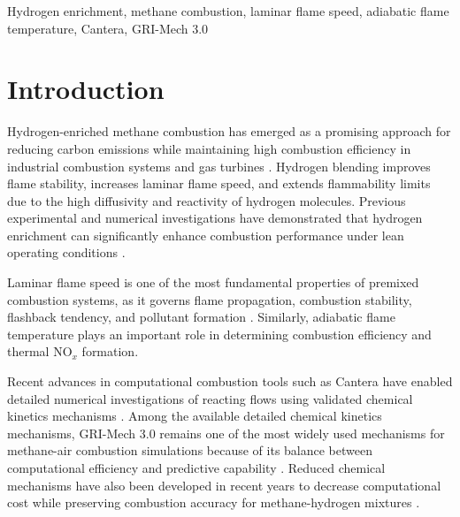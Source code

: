 \documentclass[conference]{IEEEtran}
\begin{document}

\begin{IEEEkeywords}

Hydrogen enrichment, methane combustion, laminar flame speed, adiabatic flame temperature, Cantera, GRI-Mech 3.0

\end{IEEEkeywords}


\section{Introduction}

Hydrogen-enriched methane combustion has emerged as a promising approach for reducing carbon emissions while maintaining high combustion efficiency in industrial combustion systems and gas turbines \cite{Garcia_2023,en14102834,Hermanns2007}. Hydrogen blending improves flame stability, increases laminar flame speed, and extends flammability limits due to the high diffusivity and reactivity of hydrogen molecules. Previous experimental and numerical investigations have demonstrated that hydrogen enrichment can significantly enhance combustion performance under lean operating conditions \cite{doi:10.1021/acsomega.1c01692,Garcia_2023}.

Laminar flame speed is one of the most fundamental properties of premixed combustion systems, as it governs flame propagation, combustion stability, flashback tendency, and pollutant formation \cite{doi:10.1021/acsomega.1c01692}. Similarly, adiabatic flame temperature plays an important role in determining combustion efficiency and thermal NO$_x$ formation.

Recent advances in computational combustion tools such as Cantera have enabled detailed numerical investigations of reacting flows using validated chemical kinetics mechanisms \cite{Marzouk_2023,Mao_2023}. Among the available detailed chemical kinetics mechanisms, GRI-Mech 3.0 remains one of the most widely used mechanisms for methane-air combustion simulations because of its balance between computational efficiency and predictive capability \cite{en14102834,Zhou2021-eq,GIMENOESCOBEDO201927123}. Reduced chemical mechanisms have also been developed in recent years to decrease computational cost while preserving combustion accuracy for methane-hydrogen mixtures \cite{Zhou2021-eq,GIMENOESCOBEDO201927123}.
\end{document}
